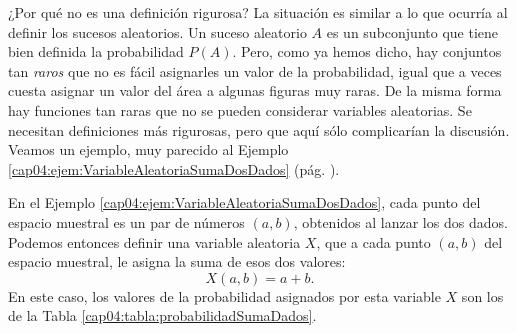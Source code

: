 ¿Por qué no es una definición rigurosa? La situación es similar a lo que ocurría al definir los sucesos aleatorios. Un suceso aleatorio $A$ es un subconjunto que tiene bien definida la probabilidad $P(A)$. Pero, como ya hemos dicho, hay conjuntos tan {\em raros} que no es fácil asignarles un valor de la probabilidad, igual que a veces cuesta asignar un valor del área a algunas figuras muy raras. De la misma forma hay funciones tan raras que no se pueden considerar variables aleatorias. Se necesitan definiciones más rigurosas, pero que aquí sólo complicarían la discusión. Veamos un ejemplo, muy parecido al Ejemplo \ref{cap04:ejem:VariableAleatoriaSumaDosDados} (pág. \pageref{cap04:ejem:VariableAleatoriaSumaDosDados}).
\begin{Ejemplo}\label{ejem:VariableAleatoria:RestaDosDados}
    En el Ejemplo \ref{cap04:ejem:VariableAleatoriaSumaDosDados}, cada punto del espacio muestral es un par de números $(a,b)$, obtenidos al lanzar los dos dados. Podemos entonces definir una variable aleatoria $X$, que a cada punto $(a,b)$ del espacio muestral, le asigna la suma de esos dos valores:
    \[X(a,b)=a+b.\]
    En este caso, los valores de la probabilidad asignados por esta variable $X$ son los de la Tabla \ref{cap04:tabla:probabilidadSumaDados}.



\end{Ejemplo}

